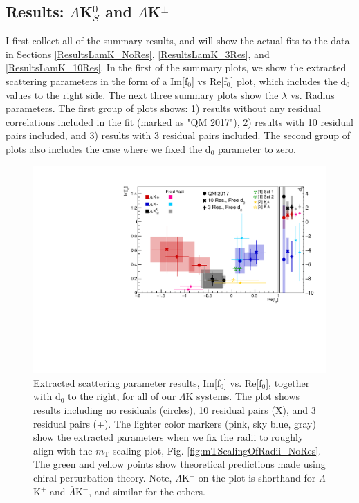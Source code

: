 \documentclass[../AnalysisNoteJBuxton.tex]{subfiles}
\begin{document}
\subsection{Results: \texorpdfstring{$\Lambda$K$^{0}_{S}$ and $\Lambda$K$^{\pm}$}{TEXT}}
\label{ResultsLamK}

I first collect all of the summary results, and will show the actual fits to the data in Sections \ref{ResultsLamK_NoRes}, \ref{ResultsLamK_3Res}, and \ref{ResultsLamK_10Res}.  In the first of the summary plots, we show the extracted scattering parameters in the form of a Im[f$_{0}$] vs Re[f$_{0}$] plot, which includes the d$_{0}$ values to the right side.  The next three summary plots show the $\lambda$ vs. Radius parameters.  The first group of plots shows: 1) results without any residual correlations included in the fit (marked as "QM 2017"), 2) results with 10 residual pairs included, and 3) results with 3 residual pairs included.  The second group of plots also includes the case where we fixed the d$_{0}$ parameter to zero.

\begin{figure}[h]
  \centering
  \includegraphics[width=\textwidth]{7_ResultsAndDiscussion/Figures/CompareAllReF0vsImF0AcrossAnalyses_10ResAnd3Res_10and3SeparateOnly_FreeD0Only_wFixedRadiiResults_wScattLenPredictions.pdf}
  \caption[Scattering Parameter Results]{Extracted scattering parameter results, Im[f$_{0}$] vs. Re[f$_{0}$], together with d$_{0}$ to the right, for all of our $\Lambda$K systems.  The plot shows results including no residuals (circles), 10 residual pairs (X), and 3 residual pairs (+).  The lighter color markers (pink, sky blue, gray) show the extracted parameters when we fix the radii to roughly align with the $m_{\mathrm{T}}$-scaling plot, Fig. \ref{fig:mTScalingOfRadii_NoRes}.  The green \cite{Liu:2006xja} and yellow \cite{Mai:2009ce} points show theoretical predictions made using chiral perturbation theory.  Note, $\Lambda$K$^{+}$ on the plot is shorthand for $\Lambda$K$^{+}$ and $\bar{\Lambda}$K$^{-}$, and similar for the others.}
  \label{fig:ImF0vsReF0_FreeD0Only}
\end{figure}
\end{document}
